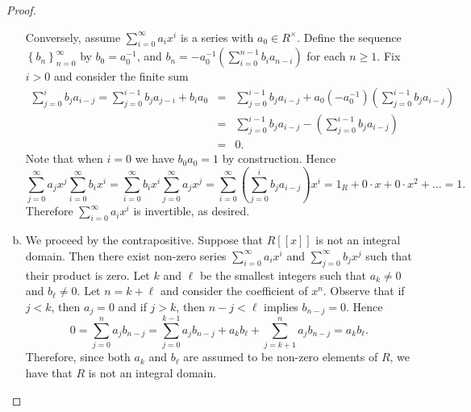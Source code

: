 \documentclass[10pt]{amsart}
\begin{document}
\begin{thm}
\begin{proof}
\begin{enumerate}[(a)]
      Conversely, assume $\sum_{i=0}^\infty a_ix^i$ is a series with $a_0 \in R^\times$.
      Define the sequence $\left\{b_n\right\}_{n=0}^\infty$ by $b_0 = a_0^{-1}$, and $b_n = -a_0^{-1}\left(\sum_{i=0}^{n-1} b_ia_{n-i}\right)$ for each $n \geq 1$.
      Fix $i > 0$ and consider the finite sum
      \begin{eqnarray*}
        \sum_{j=0}^i b_ja_{i-j} = \sum_{j=0}^{i-1} b_ja_{j-i} + b_ia_0 &=& \sum_{j=0}^{i-1} b_ja_{i-j} + a_0(-a_0^{-1})\left(\sum_{j=0}^{i-1} b_ja_{i-j}\right)\\
        &=& \sum_{j=0}^{i-1} b_ja_{i-j} - \left(\sum_{j=0}^{i-1} b_ja_{i-j}\right)\\
        &=& 0.
      \end{eqnarray*}
      Note that when $i = 0$ we have $b_0a_0 = 1$ by construction.
      Hence 
      $$\sum_{j=0}^\infty a_jx^j\sum_{i=0}^\infty b_ix^i = \sum_{i=0}^\infty b_ix^i \sum_{j=0}^\infty a_jx^j = \sum_{i=0}^\infty \left(\sum_{j=0}^i b_ja_{i-j}\right)x^i = 1_R + 0\cdot x + 0\cdot x^2 + \ldots = 1.$$
      Therefore $\sum_{i=0}^\infty a_ix^i$ is invertible, as desired.
    \item
      We proceed by the contrapositive.
      Suppose that $R[[x]]$ is not an integral domain.
      Then there exist non-zero series $\sum_{i=0}^\infty a_ix^i$ and $\sum_{j=0}^\infty b_jx^j$ such that their product is zero.
      Let $k$ and $\ell$ be the smallest integers such that $a_k \neq 0$ and $b_\ell \neq 0$.
      Let $n = k + \ell$ and consider the coefficient of $x^n$.
      Observe that if $j < k$, then $a_j = 0$ and if $j > k$, then $n - j < \ell$ implies $b_{n-j} = 0$.
      Hence
      $$0 = \sum_{j=0}^{n} a_jb_{n-j} = \sum_{j=0}^{k-1} a_jb_{n-j} + a_kb_\ell + \sum_{j=k+1}^n a_jb_{n-j} = a_kb_\ell.$$
      Therefore, since both $a_k$ and $b_\ell$ are assumed to be non-zero elements of $R$, we have that $R$ is not an integral domain.
    \end{enumerate}
  \end{proof}
\end{thm}
\end{document}
